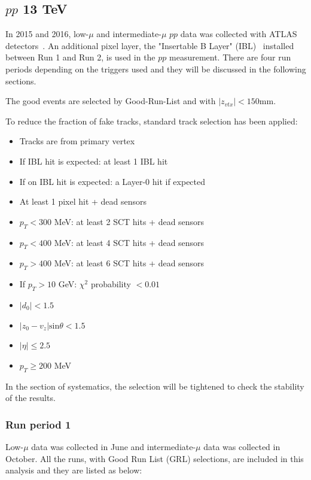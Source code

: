 \subsection{$pp$ 13 TeV}
In 2015 and 2016, low-$\mu$ and intermediate-$\mu$ $pp$ data was collected with ATLAS detectors~\cite{Aad:2008zzm}. An additional pixel layer, the "Insertable B Layer" (IBL)~\cite{atlas:1, atlas:2} installed between Run 1 and Run 2, is used in the $pp$ measurement. There are four run periods depending on the triggers used and they will be discussed in the following sections.

The good events are selected by Good-Run-List and with $|z_{vtx}|<150 $mm.

To reduce the fraction of fake tracks, standard track selection has been applied:
\begin{itemize}
\item Tracks are from primary vertex
\item If IBL hit is expected: at least 1 IBL hit
\item If on IBL hit is expected: a Layer-0 hit if expected
\item At least 1 pixel hit + dead sensors
\item $p_{T}<300$ MeV: at least 2 SCT hits + dead sensors
\item $p_{T}<400$ MeV: at least 4 SCT hits + dead sensors
\item $p_{T}>400$ MeV: at least 6 SCT hits + dead sensors
\item If $p_{T}>10$ GeV: $\chi^{2}$ probability $<0.01$
\item $|d_{0}|<1.5$
\item $|z_{0}-v_{z}|\text{sin}\theta<1.5$
\item $|\eta|\le 2.5$
\item $p_{T}\ge 200$ MeV
\end{itemize}
In the section of systematics, the selection will be tightened to check the stability of the results.



\subsubsection{Run period 1}
Low-$\mu$ data was collected in June and intermediate-$\mu$ data was collected in October. All the runs, with Good Run List (GRL) selections, are included in this analysis and they are listed as below:

